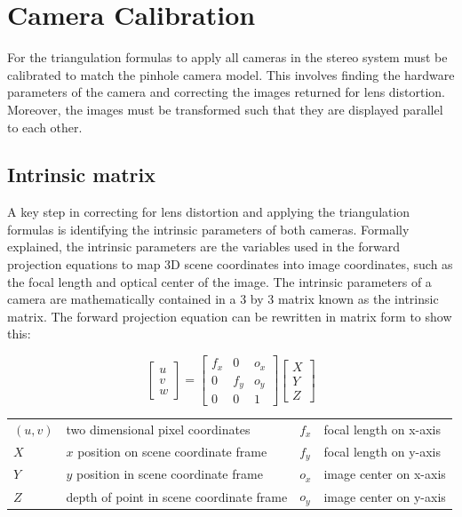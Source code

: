 \documentclass[11pt]{scrartcl}
\begin{document}
\section{Camera Calibration}

For the triangulation formulas to apply all cameras in the stereo 
system must be calibrated to match the pinhole camera model. This involves finding the hardware parameters of the camera and correcting the images returned for lens distortion. Moreover, the images must be transformed such that they are displayed parallel to each other. 

\subsection{Intrinsic matrix}

A key step in correcting for lens distortion and applying the triangulation formulas is identifying the intrinsic parameters of both cameras. Formally explained, the intrinsic parameters are the variables used in the forward projection equations to map 3D scene coordinates into image coordinates, such as the focal length and optical center of the image. The intrinsic parameters of a camera are mathematically contained in 
a 3 by 3 matrix known as the intrinsic matrix. The forward projection equation can be rewritten in matrix form to show this:
 
\begin{theorem}
	\begin{displaymath}
		\begin{bmatrix}
			u \\
			v \\
			w    \end{bmatrix} =
			\begin{bmatrix}
			f_x & 0   & o_x \\
			0   & f_y & o_y \\
			0   & 0   & 1   
		\end{bmatrix}
		\begin{bmatrix}
			X \\
			Y \\
			Z 
		\end{bmatrix} 
	\end{displaymath}
	\begin{figurekey}
		\begin{tabular}{llll}
			$(u,v)$ & two dimensional pixel coordinates        & $f_x$ & focal length on x-axis \\
			$X$     & $x$ position on scene coordinate frame   & $f_y$ & focal length on y-axis \\
			$Y$     & $y$ position in scene coordinate frame   & $o_x$ & image center on x-axis \\
			$Z$     & depth of point in scene coordinate frame & $o_y$ & image center on y-axis \\
		\end{tabular}
	\end{figurekey}
	
\end{theorem}
\end{document}
